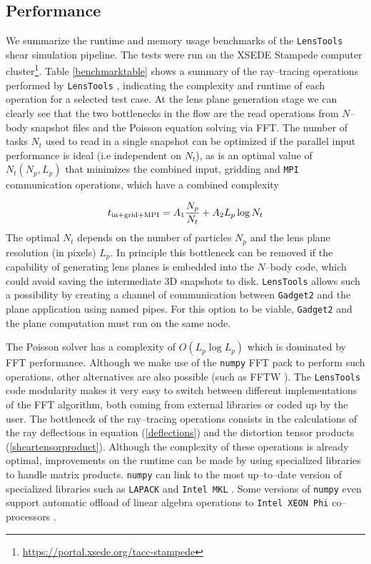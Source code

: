 \documentclass[5p]{elsarticle}
\newcommand{\ttt}[1]{\texttt{#1}}
\newcommand{\LT}{\texttt{LensTools} }
\begin{document}
\subsection{Performance}
%
We summarize the runtime and memory usage benchmarks of the \LT shear simulation pipeline. The tests were run on the XSEDE Stampede computer cluster\footnote{\url{https://portal.xsede.org/tacc-stampede}}. Table \ref{benchmarktable} shows a summary of the ray--tracing operations performed by \LT, indicating the complexity and runtime of each operation for a selected test case. At the lens plane generation stage we can clearly see that the two bottlenecks in the flow are the read operations from $N$--body snapshot files and the Poisson equation solving via FFT. The number of tasks $N_t$ used to read in a single snapshot can be optimized if the parallel input performance is ideal (i.e independent on $N_t$), as is an optimal value of $N_t(N_p,L_p)$ that minimizes the combined input, gridding and \ttt{MPI} communication operations, which have a combined complexity

\begin{equation}
t_{\rm in+grid+MPI} = A_1\frac{N_p}{N_t} + A_2L_p\log{N_t}
\end{equation} 
%
The optimal $N_t$ depends on the number of particles $N_p$ and the lens plane resolution (in pixels) $L_p$. In principle this bottleneck can be removed if the capability of generating lens planes is embedded into the $N$--body code, which could avoid saving the intermediate 3D snapshots to disk. \LT allows such a possibility by creating a channel of communication between \ttt{Gadget2} and the plane application using named pipes. For this option to be viable, \ttt{Gadget2} and the plane computation must run on the same node. 

The Poisson solver has a complexity of $O(L_p\log{L_p})$ which is dominated by FFT performance. Although we make use of the \ttt{numpy} FFT pack \citep{scipy} to perform such operations, other alternatives are also possible (such as FFTW \citep{FFTW05}). The \LT code modularity makes it very easy to switch between different implementations of the FFT algorithm, both coming from external libraries or coded up by the user. 
The bottleneck of the ray--tracing operations consists in the calculations of the ray deflections in equation (\ref{deflections}) and the distortion tensor products (\ref{sheartensorproduct}). Although the complexity of these operations is already optimal, improvements on the runtime can be made by using specialized libraries to handle matrix products. \ttt{numpy} can link to the most up--to--date version of specialized libraries such as \ttt{LAPACK} \citep{lapack} and \ttt{Intel MKL} \citep{intel-mkl}. Some versions of \ttt{numpy} even support automatic offload of linear algebra operations to \ttt{Intel XEON Phi} co--processors \citep{xeonphi}.     
\end{document}
